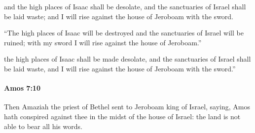 			\begin{versebox}
					\item[BHS] 
					\item[LXX] 
					\item[ASV] and the high places of Isaac shall be desolate, and the sanctuaries of Israel shall be laid waste; and I will rise against the house of Jeroboam with the sword.
					\item[NIV] “The high places of Isaac will be destroyed and the sanctuaries of Israel will be ruined; with my sword I will rise against the house of Jeroboam.”
					\item[NRSV] the high places of Isaac shall be made desolate, and the sanctuaries of Israel shall be laid waste, and I will rise against the house of Jeroboam with the sword.”
			\end{versebox}

		\paragraph{Amos 7:10} %
			\label{AMOS-7-10}

			Then Amaziah the priest of Bethel sent to Jeroboam king of Israel, saying, Amos hath conspired against thee in the midst of the house of Israel: the land is not able to bear all his words.

